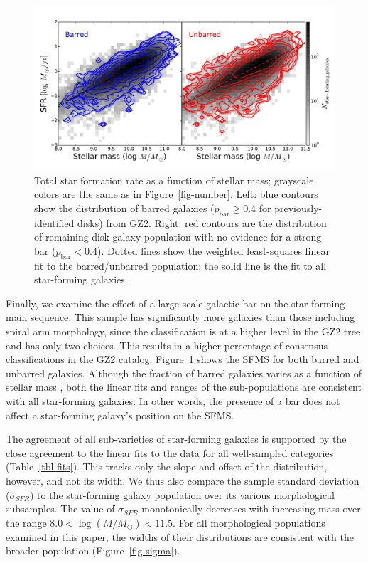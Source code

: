 \documentclass[useAMS,usenatbib]{mn2e}
\def\rr{\color{titlecol}}
\begin{document}
\begin{figure}
\includegraphics[angle=0,width=7.0in]{figures/masslim/ms_bar_contour.pdf}
\caption{Total star formation rate as a function of stellar mass; grayscale colors are the same as in Figure~\ref{fig-number}. Left: blue contours show the distribution of barred galaxies ($p_\textrm{bar}\ge0.4$ for previously-identified disks) from GZ2. Right: red contours are the distribution of remaining disk galaxy population with no evidence for a strong bar ($p_\textrm{bar}<0.4$). Dotted lines show the weighted least-squares linear fit to the barred/unbarred population; the solid line is the fit to all star-forming galaxies. 
\label{fig-bar}}
\end{figure}

Finally, we examine the effect of a large-scale galactic bar on the star-forming main sequence. This sample has significantly more galaxies than those including spiral arm morphology, since the classification is at a higher level in the GZ2 tree and has only two choices. This results in a higher percentage of consensus classifications in the GZ2 catalog. Figure~\ref{fig-bar} shows the SFMS for both barred and unbarred galaxies. Although the fraction of barred galaxies varies as a function of stellar mass \citep{she08a,cam10,mas11c,che13}, both the linear fits and ranges of the sub-populations are consistent with all star-forming galaxies. In other words, the presence of a bar does not affect a star-forming galaxy's position on the SFMS. 

The agreement of all sub-varieties of star-forming galaxies is supported by the close agreement to the linear fits to the data for all well-sampled categories (Table~\ref{tbl-fits}). This tracks only the slope and offset of the distribution, however, and not its width. We thus also compare the sample standard deviation ($\sigma_{SFR}$) to the star-forming galaxy population over its various morphological subsamples. The value of $\sigma_{SFR}$ monotonically decreases with increasing mass over the range {\rr $8.0<\log(M/M_\odot)<11.5$. For all morphological populations examined in this paper}, the widths of their distributions are consistent with the broader population (Figure~\ref{fig-sigma}). 
\end{document}

